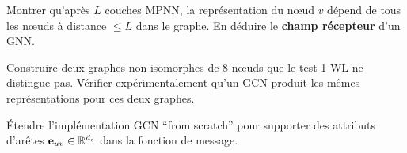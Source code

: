 \begin{exercice}
Montrer qu'apr\`es $L$ couches MPNN, la repr\'esentation du n\oe ud $v$ d\'epend
de tous les n\oe uds \`a distance $\leq L$ dans le graphe. En d\'eduire le
\textbf{champ r\'ecepteur} d'un GNN.
\end{exercice}

\begin{exercice}
Construire deux graphes non isomorphes de 8 n\oe uds que le test 1-WL ne
distingue pas. V\'erifier exp\'erimentalement qu'un GCN produit les m\^emes
repr\'esentations pour ces deux graphes.
\end{exercice}

\begin{exercice}
\'Etendre l'impl\'ementation GCN ``from scratch'' pour supporter des attributs
d'ar\^etes $\mathbf{e}_{uv} \in \mathbb{R}^{d_e}$ dans la fonction de message.
\end{exercice}
